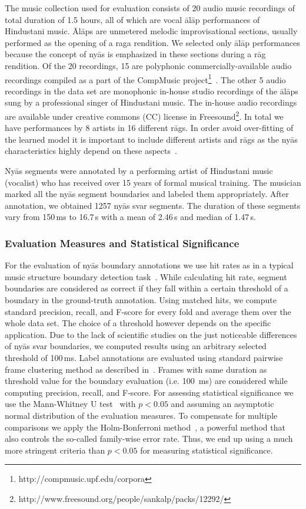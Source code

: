 {{The music collection used for evaluation consists of 20 audio music recordings  of total duration of 1.5 hours, all of which are vocal \={a}l\={a}p performances of Hindustani music. \={A}l\={a}ps are unmetered melodic improvisational sections, usually performed as the opening of a raga rendition. We selected only \={a}l\={a}p performances because the concept of ny\={a}s is emphasized in these sections during a r\={a}g rendition. Of the 20 recordings, 15 are polyphonic commercially-available audio recordings compiled as a part of the CompMusic project\footnote{http://compmusic.upf.edu/corpora}~\cite{XavierSerra2011}. The other 5 audio recordings in the data set are monophonic in-house studio recordings of the \={a}l\={a}ps sung by a professional singer of Hindustani music. The in-house audio recordings are available under creative commons (CC) license in Freesound\footnote{http://www.freesound.org/people/sankalp/packs/12292/}. In total we have performances by 8 artists in 16 different r\={a}gs. In order avoid over-fitting of the learned model it is important to include different artists and r\={a}gs as the ny\={a}s characteristics highly depend on these aspects~\cite{Dey2008}.

Ny\={a}s segments were annotated by a performing artist of Hindustani music (vocalist) who has received over 15 years of formal musical training. 
The musician marked all the ny\={a}s segment boundaries and labeled them appropriately. After annotation, we obtained 1257 ny\={a}s svar segments. The duration of these segments vary from 150\,ms to 16.7\,s with a mean of 2.46\,s and median of 1.47\,s.

\subsubsection{Evaluation Measures and Statistical Significance}

For the evaluation of ny\={a}s boundary annotations we use hit rates as in a typical music structure boundary detection task~\cite{Ong05ICMC}. While calculating hit rate, segment boundaries are considered as correct if they fall within a certain threshold of a boundary in the ground-truth annotation. Using matched hits, we compute standard precision, recall, and F-score for every fold and average them over the whole data set. The choice of a threshold however depends on the specific application. Due to the lack of scientific studies on the just noticeable differences of ny\={a}s svar boundaries, we computed results using an arbitrary selected threshold of 100\,ms. Label annotations are evaluated using standard pairwise frame clustering method as described in~\cite{levy2008structural}. Frames with same duration as threshold value for the boundary evaluation (i.e. 100~ms) are considered while computing precision, recall, and F-score. For assessing statistical significance we use the Mann-Whitney U test~\cite{mann1947test} with $p<0.05$ and assuming an asymptotic normal distribution of the evaluation measures. To compensate for multiple comparisons we apply the Holm-Bonferroni method~\cite{holm1979simple}, a powerful method that also controls the so-called family-wise error rate. Thus, we end up using a much more stringent criteria than $p<0.05$ for measuring statistical significance.

}}
